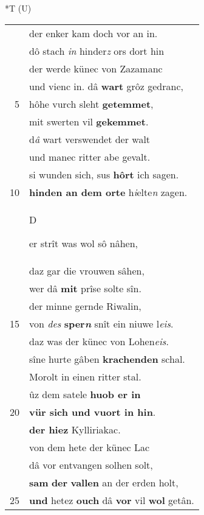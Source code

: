 \documentclass[8pt,a4paper,notitlepage]{article}
\begin{document}
\begin{table}[ht]
\begin{minipage}[t]{0.5\linewidth}
\end{minipage}
\hspace{0.5cm}
\begin{minipage}[t]{0.5\linewidth}
\small
\begin{center}*T (U)
\end{center}
\begin{tabular}{rl}
 & der enker kam doch vor an in.\\ 
 & dô stach \textit{in} hinder\textit{z} ors dort hin\\ 
 & der werde künec von Zazamanc\\ 
 & und vienc in. dâ \textbf{wart} grôz gedranc,\\ 
5 & hôhe vurch sleht \textbf{getemmet},\\ 
 & mit swerten vil \textbf{gekemmet}.\\ 
 & d\textit{â} wart verswendet der walt\\ 
 & und manec ritter abe gevalt.\\ 
 & si wunden sich, sus \textbf{hôrt} ich sagen.\\ 
10 & \textbf{hinden an dem orte} h\textit{i}elte\textit{n} zagen.\\ 
 & \begin{large}D\end{large}er strît was wol sô nâhen,\\ 
 & daz gar die vrouwen sâhen,\\ 
 & wer dâ \textbf{mit} prîse solte sîn.\\ 
 & der minne gernde Riwalin,\\ 
15 & von \textit{des} \textbf{sper\textit{n}} snît ein niuwe l\textit{eis}.\\ 
 & daz was der künec von Lohen\textit{eis}.\\ 
 & sîne hurte gâben \textbf{krachenden} schal.\\ 
 & Morolt in einen ritter stal.\\ 
 & ûz dem satele \textbf{huob er in}\\ 
20 & \textbf{vür sich und vuort in hin}.\\ 
 & \textbf{der hiez} Kylliriakac.\\ 
 & von dem hete der künec Lac\\ 
 & dâ vor entvangen solhen solt,\\ 
 & \textbf{sam} \textbf{der} \textbf{vallen} an der erden holt,\\ 
25 & \textbf{und} hetez \textbf{ouch} dâ \textbf{vor} vil \textbf{wol} getân.\\ 

\end{tabular}
\end{minipage}
\end{table}
\end{document}

